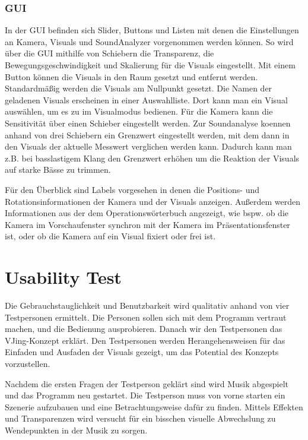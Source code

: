 \subsubsection{GUI}

In der GUI befinden sich Slider, Buttons und Listen mit denen die Einstellungen an Kamera, Visuals und SoundAnalyzer
vorgenommen werden k\"onnen. So wird \"uber die GUI mithilfe von Schiebern die Transparenz,
die Bewegungsgeschwindigkeit und Skalierung f\"ur die Visuals eingestellt. Mit einem Button k\"onnen die Visuals in den
Raum gesetzt und entfernt werden. Standardm\"a\ss{}ig werden die Visuals am Nullpunkt gesetzt. Die Namen der geladenen
Visuals erscheinen in einer Auswahlliste. Dort kann man ein Visual ausw\"ahlen, um es zu im Visualmodus bedienen.
F\"ur die Kamera kann die Sensitivit\"at \"uber einen Schieber eingestellt werden. Zur Soundanalyse koennen anhand von
drei Schiebern ein Grenzwert eingestellt werden, mit dem dann in den Visuals der aktuelle Messwert verglichen werden kann.
Dadurch kann man z.B. bei basslastigem Klang den Grenzwert erh\"ohen um die Reaktion der Visuals auf starke B\"asse zu
trimmen.

F\"ur den \"Uberblick sind Labels vorgesehen in denen die Positions- und Rotationsinformationen der Kamera und der Visuals
anzeigen. Au\ss{}erdem werden Informationen aus der dem Operationsw\"orterbuch angezeigt, wie bspw. ob die Kamera
im Vorschaufenster synchron mit der Kamera im Pr\"asentationsfenster ist, oder ob die Kamera auf ein Visual fixiert oder
frei ist.

\section{Usability Test}

Die Gebrauchstauglichkeit und Benutzbarkeit wird qualitativ anhand von vier Testpersonen ermittelt. Die Personen sollen
sich mit dem Programm vertraut machen, und die Bedienung ausprobieren. Danach wir den Testpersonen das VJing-Konzept
erkl\"art. Den Testpersonen werden Herangehensweisen f\"ur das Einfaden und Ausfaden der Visuals
gezeigt, um das Potential des Konzepts vorzustellen.

Nachdem die ersten Fragen der Testperson gekl\"art sind wird Musik abgespielt und das Programm neu gestartet. Die Testperson
muss von vorne starten ein Szenerie aufzubauen und eine Betrachtungsweise daf\"ur zu finden. Mittels Effekten und Transparenzen
wird versucht f\"ur ein bisschen visuelle Abwechslung zu Wendepunkten in der Musik zu sorgen.

